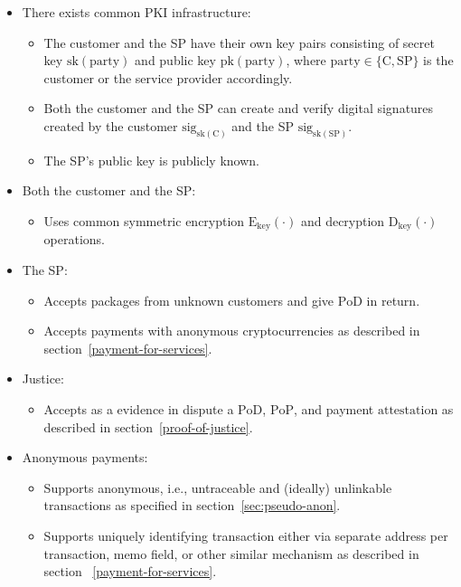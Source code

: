\documentclass{ieeeaccess}
\begin{document}
\begin{itemize}
\item There exists common PKI infrastructure:
    \begin{itemize}
        \item The customer and the SP have their own key pairs consisting of secret key $\mathrm{sk}(\mathrm{party})$ and public key $\mathrm{pk}(\mathrm{party})$, where $\mathrm{party} \in \{\mathrm{C}, \mathrm{SP}\}$ is the customer or the service provider accordingly.
        \item Both the customer and the SP can create and verify digital signatures created by the customer $\mathrm{sig}_{\mathrm{sk}(\mathrm{C})}$ and the SP $\mathrm{sig}_{\mathrm{sk}(\mathrm{SP})}$.
        \item The SP's public key is publicly known.
    \end{itemize}
    
\item Both the customer and the SP:
    \begin{itemize}
        \item Uses common symmetric encryption $\mathrm{E}_\mathrm{key}(\cdot)$ and decryption $\mathrm{D}_\mathrm{key}(\cdot)$ operations.
    \end{itemize}

\item The SP:
    \begin{itemize}
        \item Accepts packages from unknown customers and give $\mathrm{PoD}$ in return.
        \item Accepts payments with anonymous cryptocurrencies as described in section~\ref{payment-for-services}.
    \end{itemize}
    
\item Justice:
    \begin{itemize}
        \item Accepts as a evidence in dispute a $\mathrm{PoD}$, $\mathrm{PoP}$, and payment $\mathrm{attestation}$ as described in section~\ref{proof-of-justice}.
    \end{itemize}

\item Anonymous payments:
    \begin{itemize}
        \item Supports anonymous, i.e., untraceable and (ideally) unlinkable transactions as specified in section~\ref{sec:pseudo-anon}.
        \item Supports uniquely identifying transaction either via separate address per transaction, memo field, or other similar mechanism as described in section ~\ref{payment-for-services}. 
    \end{itemize}


\end{itemize}
\end{document}
